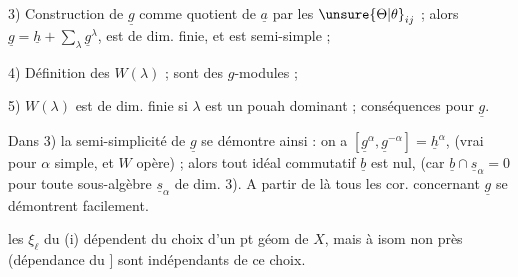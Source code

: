 3) Construction de $\underline{g}$ comme quotient de $\underline{a}$ par les $\unsure{\Theta|\theta}_{ij}$ ; alors $\underline{g}=\underline{h}+\sum_{\lambda}\underline{g}^{\lambda}$, est de dim. finie, et est semi-simple ;

4) Définition des $W(\lambda)$ ; sont des $g$-modules ;

5) $W(\lambda)$ est de dim. finie si $\lambda$ est un pouah dominant ; conséquences pour $\underline{g}$.

Dans 3) la semi-simplicité de $\underline{g}$ se démontre ainsi : on a $[\underline{g}^{\alpha},\underline{g}^{-\alpha}]=\underline{h}^{\alpha}$, (vrai pour $\alpha$ simple, et $W$ opère) ; alors tout idéal commutatif $\underline{b}$ est nul, (car $\underline{b}\cap\underline{s}_\alpha=0$ pour toute sous-algèbre $\underline{s}_\alpha$ de dim. 3). A partir de là tous les cor. concernant $\underline{g}$ se démontrent facilement.

les $\xi_{\ell}$ du (i) dépendent du choix d'un pt géom de $X$, mais à isom non  près (dépendance du ]  sont indépendants de ce choix.

